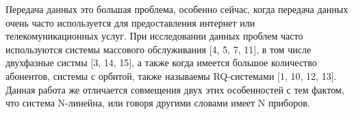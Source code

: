 
	Передача данных это большая проблема, особенно сейчас, когда передача данных очень часто используется для предоставления интернет или телекомуникационных услуг. При исследовании данных проблем часто используются системы массового обслуживания [4, 5, 7, 11], в том числе двухфазные систмы [3, 14, 15], а также когда имеется большое количество абонентов, системы с орбитой, также называемы RQ-системами [1, 10, 12, 13]. Данная работа же отличается совмещения двух этих особенностей с тем фактом, что система N-линейна, или говоря другими словами имеет N приборов.
	